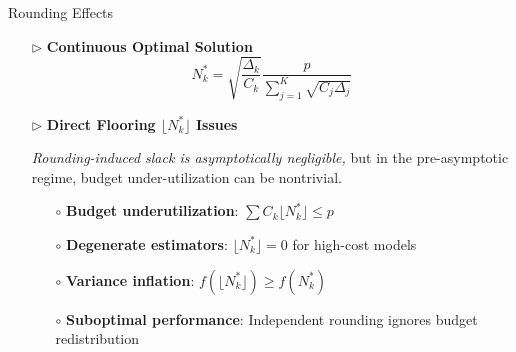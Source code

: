 \documentclass{beamer}
\begin{document}
\begin{frame}{Rounding Effects}
\begin{itemize}[leftmargin=5pt] 
\item[$\triangleright$] \textcolor{myblue3}{\bf Continuous Optimal Solution}
\[
N_k^* = \sqrt{\frac{\Delta_k}{C_k}} \frac{p}{\sum_{j=1}^K \sqrt{C_j \Delta_j}}
\]
\item[$\triangleright$] \textcolor{myblue3}{\bf Direct Flooring $\lfloor N_k^*\rfloor$ Issues}

\textit{Rounding-induced slack is asymptotically negligible,}
but in the pre-asymptotic regime, budget under-utilization can be nontrivial.

\begin{itemize}[leftmargin=15pt] 
\item[$\circ$] \textbf{Budget underutilization}: $\sum C_k \lfloor N_k^* \rfloor \le p$
\item[$\circ$] \textbf{Degenerate estimators}: $\lfloor N_k^* \rfloor = 0$ for high-cost models
\item[$\circ$] \textbf{Variance inflation}: $f(\lfloor N_k^* \rfloor) \ge f(N_k^*)$
\item[$\circ$] \textbf{Suboptimal performance}: Independent rounding ignores budget redistribution
\end{itemize}

\end{itemize}
\end{frame}
\end{document}
